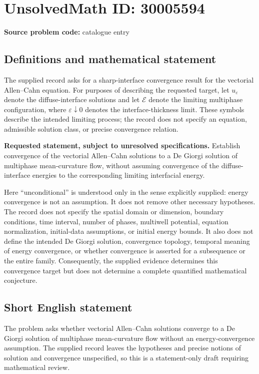 \documentclass[11pt]{article}
\begin{document}
\section*{UnsolvedMath ID: 30005594}
\textbf{Source problem code:} catalogue entry
\subsection{Definitions and mathematical statement}
The supplied record asks for a sharp-interface convergence result for the vectorial Allen--Cahn equation. For purposes of describing the requested target, let \(u_\varepsilon\) denote the diffuse-interface solutions and let \(\mathcal E\) denote the limiting multiphase configuration, where \(\varepsilon\downarrow0\) denotes the interface-thickness limit. These symbols describe the intended limiting process; the record does not specify an equation, admissible solution class, or precise convergence relation.

\textbf{Requested statement, subject to unresolved specifications.} Establish convergence of the vectorial Allen--Cahn solutions to a De Giorgi solution of multiphase mean-curvature flow, without assuming convergence of the diffuse-interface energies to the corresponding limiting interfacial energy.

Here ``unconditional'' is understood only in the sense explicitly supplied: energy convergence is not an assumption. It does not remove other necessary hypotheses. The record does not specify the spatial domain or dimension, boundary conditions, time interval, number of phases, multiwell potential, equation normalization, initial-data assumptions, or initial energy bounds. It also does not define the intended De Giorgi solution, convergence topology, temporal meaning of energy convergence, or whether convergence is asserted for a subsequence or the entire family. Consequently, the supplied evidence determines this convergence target but does not determine a complete quantified mathematical conjecture.
\subsection{Short English statement}
The problem asks whether vectorial Allen--Cahn solutions converge to a De Giorgi solution of multiphase mean-curvature flow without an energy-convergence assumption. The supplied record leaves the hypotheses and precise notions of solution and convergence unspecified, so this is a statement-only draft requiring mathematical review.
\end{document}
